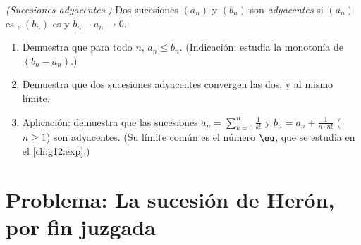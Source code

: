\begin{exercise}[$\star\star\star$]\label{exo:g12:seq:10}
\emph{(Sucesiones adyacentes.)} Dos sucesiones $(a_n)$ y $(b_n)$ son
\emph{adyacentes} si $(a_n)$ es , $(b_n)$ es  y
$b_n - a_n \to 0$.
\begin{enumerate}
  \item Demuestra que para todo $n$, $a_n \leq b_n$. (Indicación: estudia
        la monotonía de $(b_n - a_n)$.)
  \item Demuestra que dos sucesiones adyacentes convergen las dos, y al
        mismo límite.
  \item Aplicación: demuestra que las sucesiones
        $a_n = \sum_{k=0}^{n} \frac{1}{k!}$ y
        $b_n = a_n + \frac{1}{n \cdot n!}$ ($n \geq 1$) son adyacentes. (Su
        límite común es el número $\eu$, que se estudia en el
        \cref{ch:g12:exp}.)
\end{enumerate}
\end{exercise}

\section{Problema: La sucesión de Herón, por fin juzgada}

